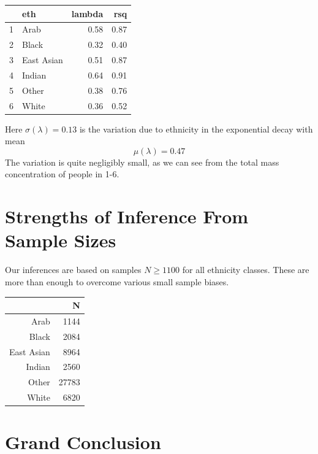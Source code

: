 \documentclass{amsart}
\begin{document}
\begin{table}[ht]
\centering
\begin{tabular}{rlrr}
  \hline
 & eth & lambda & rsq \\ 
  \hline
1 & Arab & 0.58 & 0.87 \\ 
  2 & Black & 0.32 & 0.40 \\ 
  3 & East Asian & 0.51 & 0.87 \\ 
  4 & Indian & 0.64 & 0.91 \\ 
  5 & Other & 0.38 & 0.76 \\ 
  6 & White & 0.36 & 0.52 \\ 
   \hline
\end{tabular}
\end{table}

Here $\sigma(\lambda)=0.13
$ is the variation due to ethnicity in the exponential decay with mean 
\[
\mu(\lambda)=0.47
\]
The variation is quite negligibly small, as we can see from the total mass concentration of people in 1-6.

\section{Strengths of Inference From Sample Sizes}

Our inferences are based on samples $N \ge 1100$ for all ethnicity classes.  These are more than enough to overcome various small sample biases.

\begin{table}[ht]
\centering
\begin{tabular}{rr}
  \hline
 & N \\ 
  \hline
Arab & 1144 \\ 
  Black & 2084 \\ 
  East Asian & 8964 \\ 
  Indian & 2560 \\ 
  Other & 27783 \\ 
  White & 6820 \\ 
   \hline
\end{tabular}
\end{table}

\section{Grand Conclusion}
\end{document}
